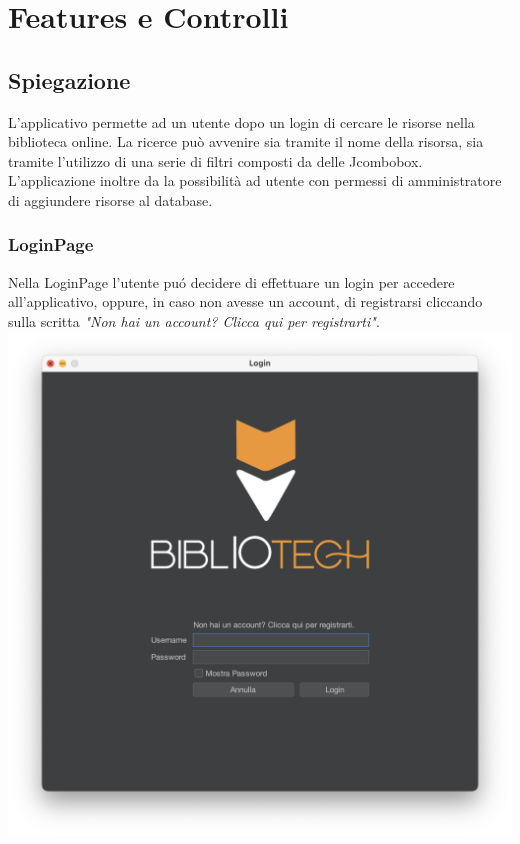 \chapter{Features e Controlli}
\section{Spiegazione}
L'applicativo permette ad un utente dopo un login di cercare le risorse nella biblioteca online.
La ricerce può avvenire sia tramite il nome della risorsa, sia tramite l'utilizzo di una serie di 
filtri composti da delle Jcombobox.
L'applicazione inoltre da la possibilità ad utente con permessi di amministratore di aggiundere risorse 
al database.


\subsection{LoginPage}
Nella LoginPage l'utente pu\'o decidere di effettuare un login per accedere all'applicativo, oppure,
in caso non avesse un account, di registrarsi cliccando sulla scritta \textit{"Non hai un account? Clicca
qui per registrarti"}.
\includegraphics[scale=0.25, center]{Immagini/Schermate/Login_Register/LoginPage.png}

